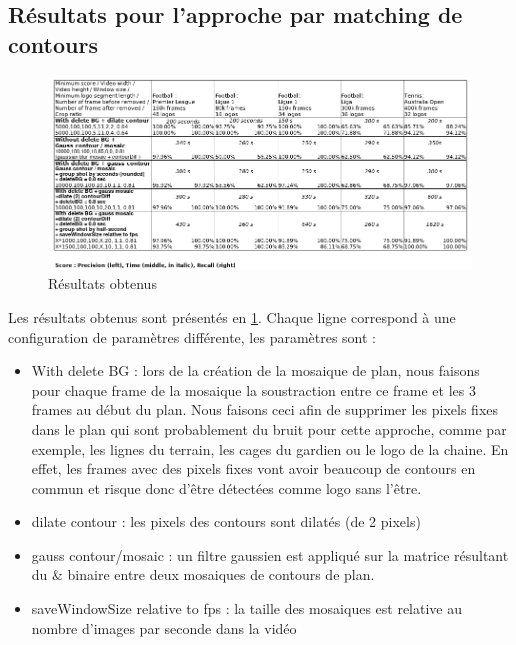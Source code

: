 \documentclass[11pt]{article}
\begin{document}
\subsection{Résultats pour l'approche par matching de contours}
\label{sec:orgdd80ffe}
\begin{figure}[htbp]
\centering
\includegraphics[width=17cm]{res_match_contour.png}
\caption{Résultats obtenus \label{res-match-contour}}
\end{figure}
Les résultats obtenus sont présentés en \ref{res-match-contour}. Chaque ligne correspond à une configuration de paramètres différente, les paramètres sont :\\
\begin{itemize}
\item With delete BG : lors de la création de la mosaique de plan, nous faisons pour chaque frame de la mosaique la soustraction entre ce frame et les 3 frames au début du plan. Nous faisons ceci afin de supprimer les pixels fixes dans le plan qui sont probablement du bruit pour cette approche, comme par exemple, les lignes du terrain, les cages du gardien ou le logo de la chaine. En effet, les frames avec des pixels fixes vont avoir beaucoup de contours en commun et risque donc d'être détectées comme logo sans l'être.\\
\item dilate contour : les pixels des contours sont dilatés (de 2 pixels)\\
\item gauss contour/mosaic : un filtre gaussien est appliqué sur la matrice résultant du \& binaire entre deux mosaiques de contours de plan.\\
\item saveWindowSize relative to fps : la taille des mosaiques est relative au nombre d'images par seconde dans la vidéo\\
\end{itemize}
\end{document}
